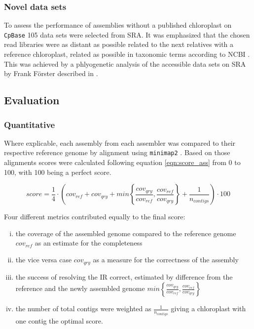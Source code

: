\subsubsection{Novel data sets}

To assess the performance of assemblies without a published chloroplast on \texttt{CpBase}
\cite{cpbase} 105 data sets were selected from SRA. It was emphasized that the chosen read
libraries were as distant as possible related to the next relatives with a reference
chloroplast, related as possible in taxonomic terms according to NCBI
\cite{ncbitaxonomy}. This was achieved by a phlyogenetic analysis of the accessible data
sets on SRA by Frank F\"orster described in \cite{freudenthal2019landscape}.

\subsection{Evaluation}
\subsubsection{Quantitative}
Where explicable, each assembly from each assembler was compared to their respective
reference genome by alignment using \texttt{minimap2} \cite{li2018minimap2}. Based on
those alignments scores were calculated following equation \ref{eqn:score_ass} from 0 to
100, with 100 being a perfect score.

\begin{equation}
  score = \frac{1}{4} \cdot \left( cov_{ref} +  cov_{qry} + min\left\{ \frac{cov_{qry}}{cov_{ref}}, \frac{cov_{ref}}{cov_{qry}}\right\} + \frac{1}{n_{contigs} }\right) \cdot 100
  \label{eqn:score_ass}
\end{equation}

Four different metrics contributed equally to the final score:

\begin{enumerate}[(i)]
\item the coverage of the assembled genome compared to the reference genome $cov_{ref}$ as
an estimate for the completeness 
\item the vice versa case $cov_{qry}$ as a measure for the correctness of the assembly 
\item the success of resolving the IR correct, estimated by difference from the reference
  and the newly assembled genome
  $min\left\{ \frac{cov_{qry}}{cov_{ref}}, \frac{cov_{ref}}{cov_{qry}}\right\}$
\item the number of total contigs were weighted as $\frac{1}{n_{contigs}}$ giving a
  chloroplast with one contig the optimal score.
\end{enumerate}

